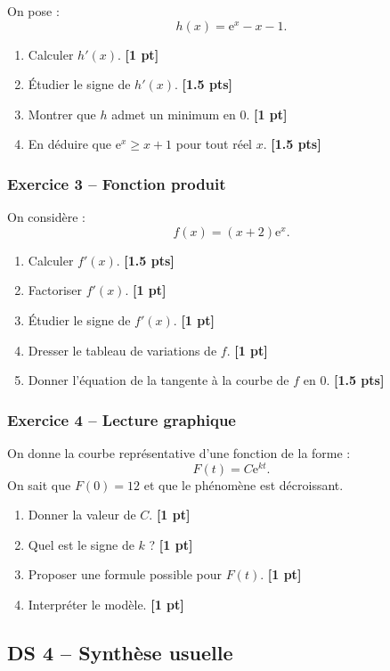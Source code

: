 \documentclass[11pt,a4paper]{article}
\newcommand{\e}{\mathrm{e}}
\newcommand{\pts}[1]{\hfill \textbf{[#1 pt]}}
\newcommand{\ptss}[1]{\hfill \textbf{[#1 pts]}}
\begin{document}
On pose :
\[
h(x)=\e^x-x-1.
\]
\begin{enumerate}
    \item Calculer $h'(x)$. \pts{1}
    \item Étudier le signe de $h'(x)$. \ptss{1.5}
    \item Montrer que $h$ admet un minimum en $0$. \pts{1}
    \item En déduire que $\e^x\geq x+1$ pour tout réel $x$. \ptss{1.5}
\end{enumerate}

\subsubsection*{Exercice 3 -- Fonction produit}

On considère :
\[
f(x)=(x+2)\e^x.
\]
\begin{enumerate}
    \item Calculer $f'(x)$. \ptss{1.5}
    \item Factoriser $f'(x)$. \pts{1}
    \item Étudier le signe de $f'(x)$. \pts{1}
    \item Dresser le tableau de variations de $f$. \pts{1}
    \item Donner l'équation de la tangente à la courbe de $f$ en $0$. \ptss{1.5}
\end{enumerate}

\subsubsection*{Exercice 4 -- Lecture graphique}

On donne la courbe représentative d'une fonction de la forme :
\[
F(t)=C\e^{kt}.
\]
On sait que $F(0)=12$ et que le phénomène est décroissant.
\begin{enumerate}
    \item Donner la valeur de $C$. \pts{1}
    \item Quel est le signe de $k$ ? \pts{1}
    \item Proposer une formule possible pour $F(t)$. \pts{1}
    \item Interpréter le modèle. \pts{1}
\end{enumerate}

\newpage

\subsection*{DS 4 -- Synthèse usuelle}
\end{document}
